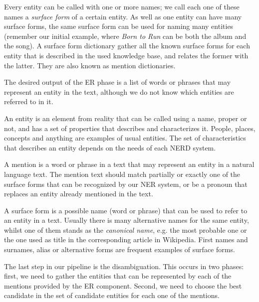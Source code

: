 Every entity can be called with one or more names; we call each one of these names a \emph{surface form} of a certain entity. As well as one entity can have many surface forms, the same surface form can be used for naming many entities (remember our initial example, where \textit{Born to Run} can be both the album and the song). A surface form dictionary gather all the known surface forms for each entity that is described in the used knowledge base, and relates the former with the latter. They are also known as mention dictionaries.

The desired output of the ER phase is a list of words or phrases that may represent an entity in the text, although we do not know which entities are referred to in it.

\begin{defi}[{\bf Entity}]
An entity is an element from reality that can be called using a name, proper or not, and has a set of properties that describes and characterizes it. People, places, concepts and anything are examples of usual entities. The set of characteristics that describes an entity depends on the needs of each NERD system.
\end{defi}

\begin{defi}[{\bf Mention}]
A mention is a word or phrase in a text that may represent an entity in a natural language text. The mention text should match partially or exactly one of the surface forms that can be recognized by our NER system, or be a pronoun that replaces an entity already mentioned in the text. 
\end{defi}

\begin{defi}
A surface form is a possible name (word or phrase) that can be used to refer to an entity in a text. Usually there is many alternative names for the same entity, whilst one of them stands as the \emph{canonical name}, e.g. the most probable one or the one used as title in the corresponding article in Wikipedia. First names and surnames, alias or alternative forms are frequent examples of surface forms.
\end{defi}

The last step in our pipeline is the disambiguation. This occurs in two phases: first, we need to gather the entities that can be represented by each of the mentions provided by the ER component. Second, we need to choose the best candidate in the set of candidate entities for each one of the mentions. 

